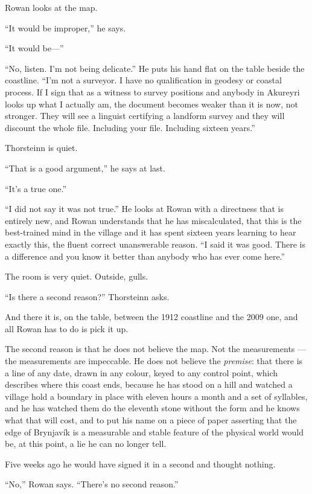 \documentclass[11pt,oneside]{book}
\begin{document}
Rowan looks at the map.

``It would be improper,'' he says.

``It would be---''

``No, listen. I'm not being delicate.'' He puts his hand flat on the
table beside the coastline. ``I'm not a surveyor. I have no
qualification in geodesy or coastal process. If I sign that as a witness
to survey positions and anybody in Akureyri looks up what I actually
am, the document becomes weaker than it is now, not stronger. They will
see a linguist certifying a landform survey and they will discount the
whole file. Including your file. Including sixteen years.''

Thorsteinn is quiet.

``That is a good argument,'' he says at last.

``It's a true one.''

``I did not say it was not true.'' He looks at Rowan with a directness
that is entirely new, and Rowan understands that he has miscalculated,
that this is the best-trained mind in the village and it has spent
sixteen years learning to hear exactly this, the fluent correct
unanswerable reason. ``I said it was good. There is a difference and you
know it better than anybody who has ever come here.''

The room is very quiet. Outside, gulls.

``Is there a second reason?'' Thorsteinn asks.

And there it is, on the table, between the 1912 coastline and the 2009
one, and all Rowan has to do is pick it up.

The second reason is that he does not believe the map. Not the
measurements --- the measurements are impeccable. He does not believe
the \emph{premise}: that there is a line of any date, drawn in any
colour, keyed to any control point, which describes where this coast
ends, because he has stood on a hill and watched a village hold a
boundary in place with eleven hours a month and a set of syllables, and
he has watched them do the eleventh stone without the form and he knows
what that will cost, and to put his name on a piece of paper asserting
that the edge of Brynjavík is a measurable and stable feature of the
physical world would be, at this point, a lie he can no longer tell.

Five weeks ago he would have signed it in a second and thought nothing.

``No,'' Rowan says. ``There's no second reason.''
\end{document}
